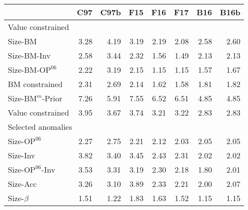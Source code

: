 
\begin{tabular}{lrrrrrrr}
  \toprule
     & C97  & C97b  & F15  & F16  & F17  & B16  & B16b  \\
  \midrule
  
    \multicolumn{8}{l}{Value constrained} \\
    
    Size-BM  & 3.28  & 4.19  & 3.19  & 2.19  & 2.08  & 2.58  & 2.60  \\
    
  
    
    
    Size-BM-Inv  & 2.58  & 3.44  & 2.32  & 1.56  & 1.49  & 2.13  & 2.13  \\
    
  
    
    
    Size-BM-$\text{OP}^{06}$  & 2.22  & 3.19  & 2.15  & 1.15  & 1.15  & 1.57  & 1.67  \\
    
  
    
    
    BM constrained  & 2.31  & 2.69  & 2.14  & 1.62  & 1.58  & 1.81  & 1.82  \\
    [1em]
  
    
    
    Size-$\text{BM}^m$-Prior  & 7.26  & 5.91  & 7.55  & 6.52  & 6.51  & 4.85  & 4.85  \\
    
  
    
    
    Value constrained  & 3.95  & 3.67  & 3.74  & 3.21  & 3.22  & 2.83  & 2.83  \\
    [1em]
  
    
    \multicolumn{8}{l}{Selected anomalies} \\
    Size-$\text{OP}^{06}$  & 2.27  & 2.75  & 2.21  & 2.12  & 2.03  & 2.05  & 2.05  \\
    
  
    
    
    Size-Inv  & 3.82  & 3.40  & 3.45  & 2.43  & 2.31  & 2.02  & 2.02  \\
    
  
    
    
    Size-$\text{OP}^{06}$-Inv  & 3.53  & 3.31  & 3.19  & 2.30  & 2.18  & 1.80  & 2.01  \\
    
  
    
    
    Size-Acc  & 3.26  & 3.10  & 3.89  & 2.33  & 2.21  & 2.00  & 2.07  \\
    
  
    
    
    Size-$\beta$  & 1.51  & 1.22  & 1.83  & 1.63  & 1.52  & 1.15  & 1.15  \\
    

\end{tabular}
